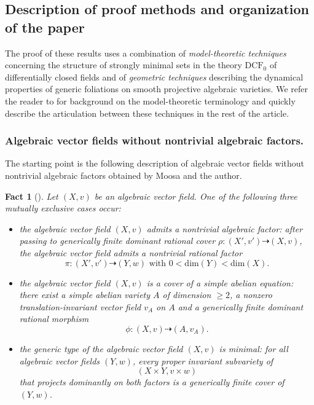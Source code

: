 \documentclass[12pt]{amsart}
\theoremstyle{definition}
\theoremstyle{plain}
\newtheorem{fact}[definition]{Fact}
\theoremstyle{exampstyle}
\theoremstyle{exampstyle}\newtheorem{thmxbis}{Theorem}
\numberwithin{equation}{section}
\theoremstyle{remark}
\begin{document}
\subsection{Description of proof methods and organization of the paper} The proof of these results uses a combination of {\em model-theoretic techniques} concerning the structure of strongly minimal sets in the theory $\mathrm{DCF}_0$ of differentially closed fields and of {\em geometric techniques} describing the dynamical properties of generic foliations on smooth projective algebraic varieties. We refer the reader to \cite{Bouscaren, Marker, Pizarro} for background on the model-theoretic terminology and quickly describe the articulation between these techniques in the rest of the article. 




\subsubsection*{Algebraic vector fields without nontrivial algebraic factors.} The starting point is the following description of algebraic vector fields without nontrivial algebraic factors obtained by Moosa and the author.
%
\begin{fact}[{\cite[Theorem 1.3]{Jaoui-Moosa}}] \label{fact-Jaoui-Moosa}
Let $(X,v)$ be an algebraic vector field. One of the following three mutually exclusive cases occur: 

\begin{itemize} 
\item[(i)] the algebraic vector field $(X,v)$ admits {\em a nontrivial algebraic factor}: after passing to  generically finite dominant rational cover $\rho: (X',v') \dashrightarrow (X,v)$, the algebraic vector field admits a nontrivial rational factor 
 $$\pi: (X',v') \dashrightarrow (Y,w) \text{ with } 0 < \mathrm{dim}(Y) < \mathrm{dim}(X).$$ 
\item[(ii)] the algebraic vector field $(X,v)$ is {\em{a cover of a simple  abelian equation}}: there exist a simple abelian variety $A$ of dimension $\geq 2$, a nonzero translation-invariant vector field $v_A$ on $A$ and a generically finite dominant rational morphism 
$$ \phi : (X,v) \dashrightarrow (A,v_A).$$

\item[(iii)] the generic type of the algebraic vector field $(X,v)$ is {\em minimal}: for all algebraic vector fields $(Y,w)$, every proper invariant subvariety of $$(X \times Y,v \times w)$$ that projects dominantly on both factors is a generically finite cover of $(Y,w)$.
\end{itemize}   
\end{fact} 
\end{document}
